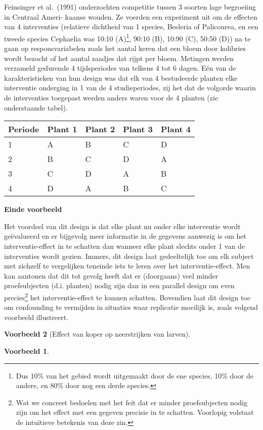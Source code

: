 \documentclass[
  12pt,dutch,coursenotes]{book}
\theoremstyle{definition}
\theoremstyle{definition}
\newtheorem{example}{Voorbeeld}[chapter]
\theoremstyle{definition}
\theoremstyle{remark}
\begin{document}
Feinsinger et al.~(1991) onderzochten competitie tussen 3 soorten lage begroeiing in Centraal Ameri- kaanse wouden. Ze voerden een experiment uit om de effecten van 4 interventies (relatieve dichtheid van 1 species, Besleria of Palicourea, en een tweede species Cephaelia was 10:10 (A)\footnote{Dus 10\% van het gebied wordt uitgemaakt door de ene species, 10\% door de andere, en 80\% door nog een derde species.}, 90:10 (B), 10:90 (C), 50:50 (D)) na te gaan op responsvariabelen zoals het aantal keren dat een bloem door kolibries wordt bezocht of het aantal zaadjes dat rijpt per bloem. Metingen werden verzameld gedurende 4 tijdsperiodes van telkens 4 tot 6 dagen. Eén van de karakteristieken van hun design was dat elk van 4 bestudeerde planten elke interventie onderging in 1 van de 4 studieperiodes, zij het dat de volgorde waarin de interventies toegepast werden anders waren voor de 4 planten (zie onderstaande tabel).

\begin{longtable}[]{@{}lllll@{}}
\toprule
Periode & Plant 1 & Plant 2 & Plant 3 & Plant 4\tabularnewline
\midrule
\endhead
1 & A & B & C & D\tabularnewline
2 & B & C & D & A\tabularnewline
3 & C & D & A & B\tabularnewline
4 & D & A & B & C\tabularnewline
\bottomrule
\end{longtable}

\textbf{Einde voorbeeld}

Het voordeel van dit design is dat elke plant nu onder elke
interventie wordt geëvalueerd en er bijgevolg meer informatie in de
gegevens aanwezig is om het interventie-effect in te schatten dan wanneer
elke plant slechts onder 1 van de interventies wordt gezien. Immers, dit design laat gedeeltelijk toe om elk subject met zichzelf te vergelijken teneinde iets te leren over het interventie-effect. Men kan
aantonen dat dit tot gevolg heeft dat er (doorgaans) veel minder
proefsubjecten (d.i. planten) nodig zijn dan in een parallel design om even precies\footnote{Wat we concreet bedoelen met het feit dat er minder proefsubjecten nodig zijn
  om het effect met een gegeven precisie in te schatten. Voorlopig volstaat de intuïtieve betekenis van deze zin.} het interventie-effect te kunnen
schatten. Bovendien laat dit design toe om confounding te vermijden in situaties waar replicatie moeilijk is, zoals volgend voorbeeld illustreert.

\begin{example}[Effect van koper op neerstrijken van larven]
\begin{example}

\protect\hypertarget{exm:unnamed-chunk-77}{}{\label{exm:unnamed-chunk-77} \iffalse (Effect van koper op neerstrijken van larven) \fi{} }

\end{example}
\end{example}
\end{document}
